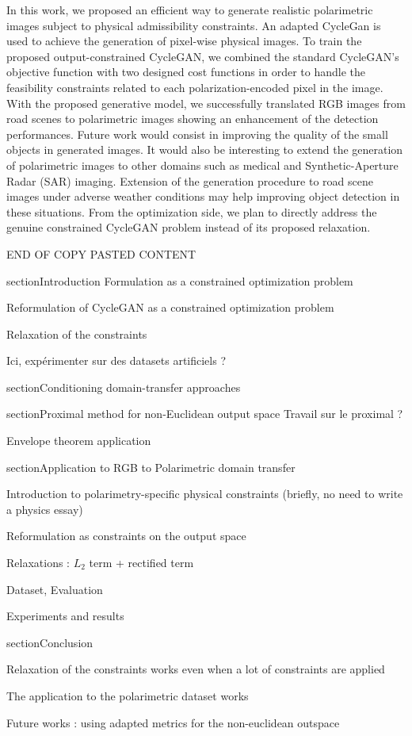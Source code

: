 In this work, we proposed an efficient way to generate realistic polarimetric images subject to physical admissibility constraints. An adapted CycleGan is used to achieve the generation of pixel-wise physical images. To train the proposed output-constrained CycleGAN, we combined the standard CycleGAN's objective function with two designed cost functions in order to handle the feasibility constraints related to each polarization-encoded pixel in the image. 
With the proposed generative model, we successfully translated RGB images from road scenes to polarimetric images showing an enhancement of the detection performances.
Future work would consist in improving the quality of the small objects in generated images. It would also be interesting to extend the generation of polarimetric images to other domains such as medical and Synthetic-Aperture Radar (SAR) imaging. Extension of the generation procedure to road scene images under adverse weather conditions may help improving object detection in these situations. From the optimization side, we plan to directly address the genuine constrained CycleGAN problem instead of its proposed relaxation. 

{\Huge END OF COPY PASTED CONTENT}


section{Introduction}
Formulation as a constrained optimization problem

Reformulation of CycleGAN as a constrained optimization problem 

Relaxation of the constraints

Ici, expérimenter sur des datasets artificiels ?

section{Conditioning domain-transfer approaches}

section{Proximal method for non-Euclidean output space}
Travail sur le proximal ?

Envelope theorem application

section{Application to RGB to Polarimetric domain transfer}

Introduction to polarimetry-specific physical constraints (briefly, no need to write a physics essay)

Reformulation as constraints on the output space

Relaxations : $L_2$ term + rectified term

Dataset, Evaluation

Experiments and results

section{Conclusion}

Relaxation of the constraints works even when a lot of constraints are applied

The application to the polarimetric dataset works

Future works : using adapted metrics for the non-euclidean outspace